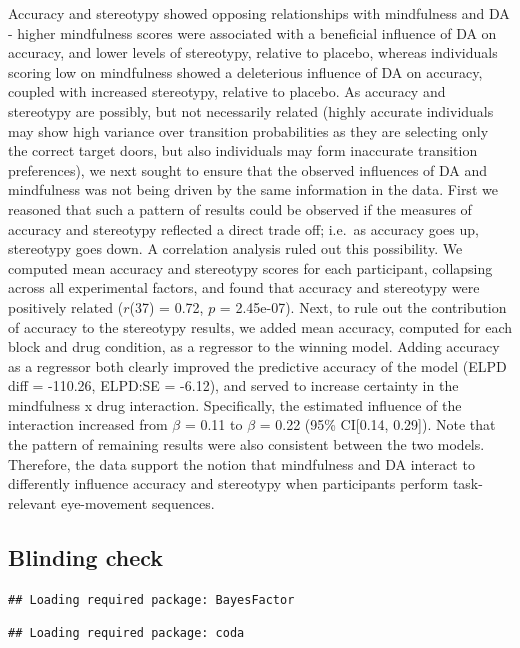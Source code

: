 \documentclass{article}
\begin{document}
Accuracy and stereotypy showed opposing relationships with mindfulness
and DA - higher mindfulness scores were associated with a beneficial
influence of DA on accuracy, and lower levels of stereotypy, relative to
placebo, whereas individuals scoring low on mindfulness showed a
deleterious influence of DA on accuracy, coupled with increased
stereotypy, relative to placebo. As accuracy and stereotypy are
possibly, but not necessarily related (highly accurate individuals may
show high variance over transition probabilities as they are selecting
only the correct target doors, but also individuals may form inaccurate
transition preferences), we next sought to ensure that the observed
influences of DA and mindfulness was not being driven by the same
information in the data. First we reasoned that such a pattern of
results could be observed if the measures of accuracy and stereotypy
reflected a direct trade off; i.e.~as accuracy goes up, stereotypy goes
down. A correlation analysis ruled out this possibility. We computed
mean accuracy and stereotypy scores for each participant, collapsing
across all experimental factors, and found that accuracy and stereotypy
were positively related (\(r\)(37) = 0.72, \(p\) = 2.45e-07). Next, to
rule out the contribution of accuracy to the stereotypy results, we
added mean accuracy, computed for each block and drug condition, as a
regressor to the winning model. Adding accuracy as a regressor both
clearly improved the predictive accuracy of the model (ELPD diff =
-110.26, ELPD:SE = -6.12), and served to increase certainty in the
mindfulness x drug interaction. Specifically, the estimated influence of
the interaction increased from \(\beta\) = 0.11 to \(\beta\) = 0.22
(95\% CI{[}0.14, 0.29{]}). Note that the pattern of remaining results
were also consistent between the two models. Therefore, the data support
the notion that mindfulness and DA interact to differently influence
accuracy and stereotypy when participants perform task-relevant
eye-movement sequences.

\hypertarget{blinding-check}{%
\subsection{Blinding check}\label{blinding-check}}

\begin{verbatim}
## Loading required package: BayesFactor
\end{verbatim}

\begin{verbatim}
## Loading required package: coda
\end{verbatim}
\end{document}
